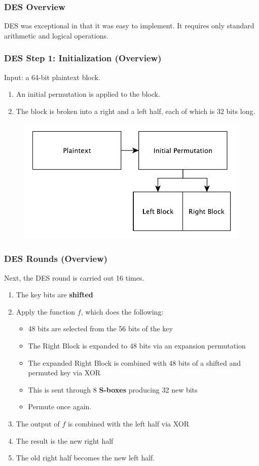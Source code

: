 \documentclass{beamer}
\newcommand{\<}{\langle}
\renewcommand{\>}{\rangle}
\begin{document}
\begin{frame}
\frametitle{DES Overview}

DES was exceptional in that it was easy to implement. It requires only standard arithmetic and logical operations. 
\end{frame}


\begin{frame}
\frametitle{DES Step 1: Initialization (Overview)}

Input: a 64-bit plaintext block.

\begin{enumerate}[(1)]
\item An initial permutation is applied to the block.
\item The block is broken into a right and a left half, each of which is 32 bits long.
\end{enumerate}

\begin{figure}
\includegraphics[scale=.5]{IMG/des3}
\end{figure}
\end{frame}


\begin{frame}
\frametitle{DES Rounds (Overview)}

Next, the DES round is carried out 16 times. 
\begin{enumerate}[(1)]
\item The key bits are \textbf{shifted}
\item
Apply the function $f$, which does the following:
\begin{itemize}
    \item 48 bits are selected from the 56 bits of the key
    \item The Right Block is expanded to 48 bits via an expansion permutation
    \item The expanded Right Block is combined with 48 bits of a shifted and permuted key via XOR
    \item This is sent through 8 \textbf{S-boxes} producing 32 new bits
    \item Permute once again.
    \end{itemize}
\item The output of $f$ is combined with the left half via XOR
\item The result is the new right half
\item The old right half becomes the new left half. 
\end{enumerate}
\end{frame}
\end{document}
